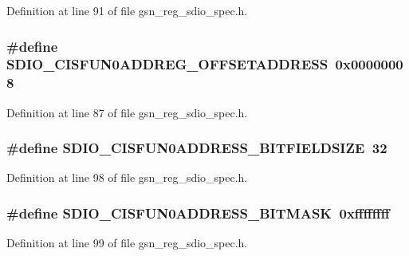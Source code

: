Definition at line 91 of file gsn\_\-reg\_\-sdio\_\-spec.h.

\hypertarget{a00571_a24d91a3b89afaebd6c3121cf990473e3}{
\subsubsection[{SDIO\_\-CISFUN0ADDREG\_\-OFFSETADDRESS}]{\setlength{\rightskip}{0pt plus 5cm}\#define SDIO\_\-CISFUN0ADDREG\_\-OFFSETADDRESS~0x00000008}}
\label{a00571_a24d91a3b89afaebd6c3121cf990473e3}


Definition at line 87 of file gsn\_\-reg\_\-sdio\_\-spec.h.

\hypertarget{a00571_a5997174ca163f33ab4f77908ce25762f}{
\subsubsection[{SDIO\_\-CISFUN0ADDRESS\_\-BITFIELDSIZE}]{\setlength{\rightskip}{0pt plus 5cm}\#define SDIO\_\-CISFUN0ADDRESS\_\-BITFIELDSIZE~32}}
\label{a00571_a5997174ca163f33ab4f77908ce25762f}


Definition at line 98 of file gsn\_\-reg\_\-sdio\_\-spec.h.

\hypertarget{a00571_a79be08768dccf5e7e0662e62f1ff0824}{
\subsubsection[{SDIO\_\-CISFUN0ADDRESS\_\-BITMASK}]{\setlength{\rightskip}{0pt plus 5cm}\#define SDIO\_\-CISFUN0ADDRESS\_\-BITMASK~0xffffffff}}
\label{a00571_a79be08768dccf5e7e0662e62f1ff0824}


Definition at line 99 of file gsn\_\-reg\_\-sdio\_\-spec.h.

